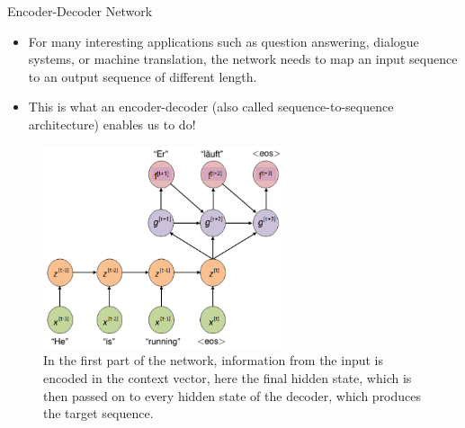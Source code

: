 \begin{vbframe}{Encoder-Decoder Network}
  \begin{itemize}
    \item For many interesting applications such as question answering, dialogue systems, or machine translation, the network needs to map an input sequence to an output sequence of different length.
    \item This is what an encoder-decoder (also called sequence-to-sequence architecture) enables us to do!
    
    \end{itemize}
 
 \framebreak
 
  \begin{figure}
    \includegraphics[width=7cm]{plots/seq2seq_2.png}
    \caption{%
    In the first part of the network, information from the input is encoded in the context vector, here the final hidden state, which is then passed on to every hidden state of the decoder, which produces the target sequence.}
  \end{figure} 
    
    
    \begin{itemize}
   

\end{itemize}
\end{vbframe}
